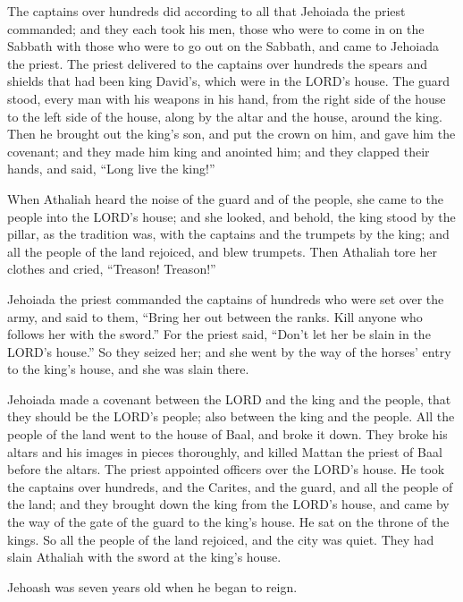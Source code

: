  The captains over hundreds did according to all that
Jehoiada the priest commanded; and they each took his men, those who
were to come in on the Sabbath with those who were to go out on the
Sabbath, and came to Jehoiada the priest.  The priest
delivered to the captains over hundreds the spears and shields that had
been king David's, which were in the LORD's house.  The
guard stood, every man with his weapons in his hand, from the right side
of the house to the left side of the house, along by the altar and the
house, around the king.  Then he brought out the king's
son, and put the crown on him, and gave him the covenant; and they made
him king and anointed him; and they clapped their hands, and said,
``Long live the king!''

 When Athaliah heard the noise of the guard and of the
people, she came to the people into the LORD's house;  and
she looked, and behold, the king stood by the pillar, as the tradition
was, with the captains and the trumpets by the king; and all the people
of the land rejoiced, and blew trumpets. Then Athaliah tore her clothes
and cried, ``Treason! Treason!''

 Jehoiada the priest commanded the captains of hundreds who
were set over the army, and said to them, ``Bring her out between the
ranks. Kill anyone who follows her with the sword.'' For the priest
said, ``Don't let her be slain in the LORD's house.''  So
they seized her; and she went by the way of the horses' entry to the
king's house, and she was slain there.

 Jehoiada made a covenant between the LORD and the king and
the people, that they should be the LORD's people; also between the king
and the people.  All the people of the land went to the
house of Baal, and broke it down. They broke his altars and his images
in pieces thoroughly, and killed Mattan the priest of Baal before the
altars. The priest appointed officers over the LORD's house.
 He took the captains over hundreds, and the Carites, and
the guard, and all the people of the land; and they brought down the
king from the LORD's house, and came by the way of the gate of the guard
to the king's house. He sat on the throne of the kings.  So
all the people of the land rejoiced, and the city was quiet. They had
slain Athaliah with the sword at the king's house.

 Jehoash was seven years old when he began to reign.

